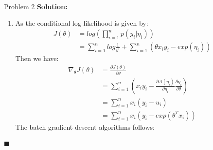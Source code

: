\documentclass{article}
\newenvironment{solution}                               %
{\textbf{Solution:} }{$\blacksquare$}                   %
\begin{document}
\begin{section}{Problem 2}
\begin{solution}
\begin{enumerate}[label=(\alph*)]
                \item 
                As the conditional log likelihood is given by:
                \begin{align*}
                    J(\theta) &= log(\prod_{i=1}^{n} p(y_i | \eta_i)) \\
                    &= \sum_{i=1}^{n} log \frac{1}{y!} + \sum_{i=1}^{n}(\theta x_i y_i - exp(\eta_i))
                \end{align*}
                Then we have:
                \begin{align*}
                    \nabla_{\theta} J(\theta) &= \frac{\partial J(\theta)}{\partial \theta} \\
                    &= \sum_{i=1}^{n} (x_i y_i - \frac{\partial A(\eta_i)}{\partial \eta_i} \frac{\partial \eta_i}{\partial \theta}) \\
                    &= \sum_{i=1}^{n} x_i (y_i - u_i) \\
                    &= \sum_{i=1}^{n} x_i (y_i - exp(\theta^T x_i))
                \end{align*}
                The batch gradient descent algorithms follows:\\
                \begin{algorithm}[H]
                    \DontPrintSemicolon
                \end{algorithm}
                

\end{enumerate}
\end{solution}
\end{section}
\end{document}
